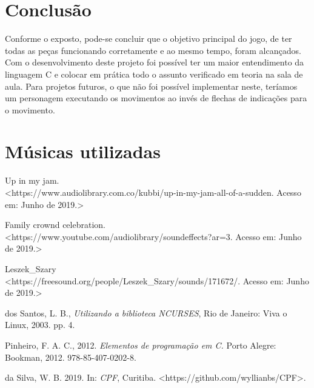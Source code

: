 \documentclass[journal]{IEEEtran}
\begin{document}
\section{Conclusão}
Conforme o exposto, pode-se concluir que o objetivo principal do jogo, de ter todas as peças funcionando corretamente e ao mesmo tempo, foram alcançados. Com o desenvolvimento deste projeto foi possível ter um maior entendimento da linguagem C e colocar em prática todo o assunto verificado em teoria na sala de aula. Para projetos futuros, o que não foi possível implementar neste, teríamos um personagem executando os movimentos ao invés de flechas de indicações para o movimento.  

\appendices

\section{Músicas utilizadas}
Up in my jam. 
\\<https://www.audiolibrary.com.co/kubbi/up-in-my-jam-all-of-a-sudden. Acesso em: Junho de 2019.>

Family crownd celebration. \\<https://www.youtube.com/audiolibrary/soundeffects?ar=3. Acesso em: Junho de 2019.>

Leszek\_Szary 
\\<https://freesound.org/people/Leszek\_Szary/sounds/171672/. Acesso em: Junho de 2019.>

 \begin{thebibliography}{10} 
 
     dos Santos, L. B., \emph{Utilizando a biblioteca NCURSES}, Rio de Janeiro: Viva o Linux, 2003. pp. 4.
 
     Pinheiro, F. A. C., 2012. {\em Elementos de programação em C.} Porto Alegre: Bookman, 2012. 
     978-85-407-0202-8.

     da Silva, W. B. 2019. In: {\em CPF}, Curitiba. <https://github.com/wyllianbs/CPF>.
 
 \end{thebibliography}
\end{document}
